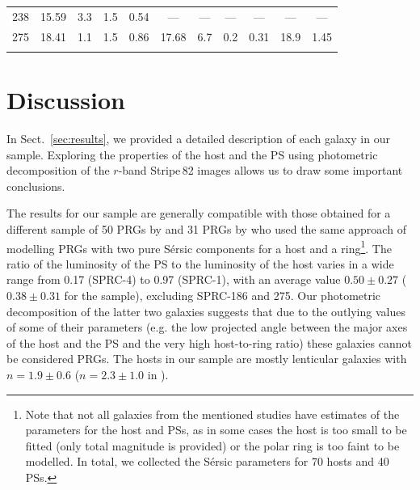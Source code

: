 \documentclass{raa}
\begin{document}
\begin{table}
\begin{tabular}{ccccccccccc}
238 & 15.59 & 3.3 & 1.5 & 0.54 & --- & --- & --- & --- & --- & ---\\
275 & 18.41 & 1.1 & 1.5 & 0.86 & 17.68 & 6.7 & 0.2 & 0.31 & 18.9 & 1.45\\
\noalign{\smallskip}\hline
\end{tabular}
\ec
{}
\end{table}





\section{Discussion}
\label{sec:discussion}

In Sect.~\ref{sec:results}, we provided a detailed description of each galaxy in our sample. Exploring the properties of the host and the PS using photometric decomposition of the $r$-band Stripe\,82 images allows us to draw some important conclusions.

The results for our sample are generally compatible with those obtained for a different sample of 50 PRGs by \citet{rc2015} and 31 PRGs by \citet{rm2019} who used the same approach of modelling PRGs with two pure S\'ersic components for a host and a ring\footnote{Note that not all galaxies from the mentioned studies have estimates of the parameters for the host and PSs, as in some cases the host is too small to be fitted (only total magnitude is provided) or the polar ring is too faint to be modelled. In total, we collected the S\'ersic parameters for 70 hosts and 40 PSs.}. The ratio of the luminosity of the PS to the luminosity of the host varies in a wide range from 0.17 (SPRC-4) to 0.97 (SPRC-1), with an average value $0.50\pm0.27$ ($0.38\pm0.31$ for the \citealt{rc2015} sample), excluding SPRC-186 and 275. Our photometric decomposition of the latter two galaxies suggests that due to the outlying values of some of their parameters (e.g. the low projected angle between the major axes of the host and the PS and the very high host-to-ring ratio) these galaxies cannot be considered PRGs. The hosts in our sample are mostly lenticular galaxies with $n=1.9\pm0.6$ ($n=2.3\pm1.0$ in \citealt{rc2015}).
\end{document}
